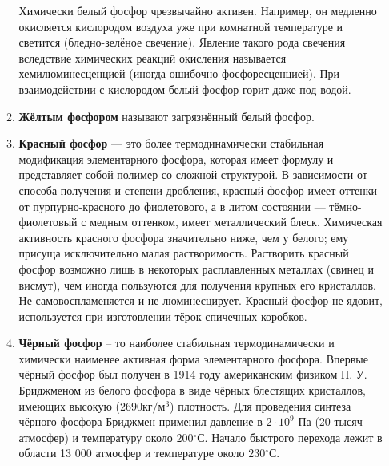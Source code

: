 \begin{itemize}
\begin{enumerate}
        Химически белый фосфор чрезвычайно активен. Например, он медленно окисляется кислородом воздуха уже при комнатной температуре и светится (бледно-зелёное свечение). Явление такого рода свечения вследствие химических реакций окисления называется хемилюминесценцией (иногда ошибочно фосфоресценцией). При взаимодействии с кислородом белый фосфор горит даже под водой. 
        
        \item \textbf{Жёлтым фосфором} называют загрязнённый белый фосфор.
        \item \textbf{Красный фосфор} — это более термодинамически стабильная модификация элементарного фосфора, которая имеет формулу  и представляет собой полимер со сложной структурой. В зависимости от способа получения и степени дробления, красный фосфор имеет оттенки от пурпурно-красного до фиолетового, а в литом состоянии --- тёмно-фиолетовый с медным оттенком, имеет металлический блеск. Химическая активность красного фосфора значительно ниже, чем у белого; ему присуща исключительно малая растворимость. Растворить красный фосфор возможно лишь в некоторых расплавленных металлах (свинец и висмут), чем иногда пользуются для получения крупных его кристаллов. Не самовоспламеняется и не люминесцирует. Красный фосфор не ядовит, используется при изготовлении тёрок спичечных коробков.
        \item \textbf{Чёрный фосфор} -- то наиболее стабильная термодинамически и химически наименее активная форма элементарного фосфора. Впервые чёрный фосфор был получен в 1914 году американским физиком П. У. Бриджменом из белого фосфора в виде чёрных блестящих кристаллов, имеющих высокую ($2690 \text{кг}/\text{м}^{3}$) плотность. Для проведения синтеза чёрного фосфора Бриджмен применил давление в $2\cdot10^{9}$ Па (20 тысяч атмосфер) и температуру около $200 {}^{\circ}\mathrm{С}$. Начало быстрого перехода лежит в области 13 000 атмосфер и температуре около $230 {}^{\circ}\mathrm{С}$.


\end{enumerate}
\end{itemize}
